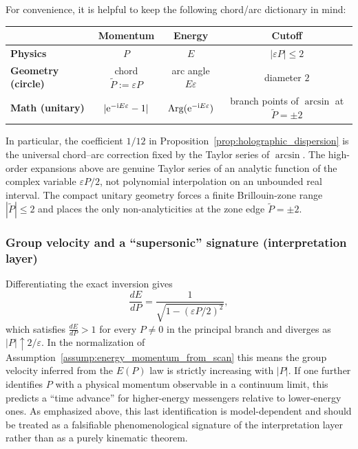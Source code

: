 \begin{remark}
For convenience, it is helpful to keep the following chord/arc dictionary in mind:
{\small
\begin{center}
\renewcommand{\arraystretch}{1.15}
\begin{tabular}{l|c|c|c}
\hline
 & \textbf{Momentum} & \textbf{Energy} & \textbf{Cutoff} \\
\hline
\textbf{Physics} & $P$ & $E$ & $|\varepsilon P|\le 2$ \\
\textbf{Geometry (circle)} & chord $\tilde P:=\varepsilon P$ & arc angle $E\varepsilon$ & diameter $2$ \\
\textbf{Math (unitary)} & $|\mathrm{e}^{-\mathrm{i} E\varepsilon}-1|$ & $\mathrm{Arg}(\mathrm{e}^{-\mathrm{i} E\varepsilon})$ & branch points of $\arcsin$ at $\tilde P=\pm 2$ \\
\hline
\end{tabular}
\end{center}
}
In particular, the coefficient $1/12$ in Proposition~\ref{prop:holographic_dispersion} is the universal chord--arc correction fixed by the Taylor series of $\arcsin$.
The high-order expansions above are genuine Taylor series of an analytic function of the complex variable $\varepsilon P/2$, not polynomial interpolation on an unbounded real interval.
The compact unitary geometry forces a finite Brillouin-zone range $|\tilde P|\le 2$ and places the only non-analyticities at the zone edge $\tilde P=\pm 2$.
\end{remark}

\subsubsection{Group velocity and a ``supersonic'' signature (interpretation layer)}
\label{subsubsec:dispersion_group_velocity}
Differentiating the exact inversion gives
$$
\frac{dE}{dP}=\frac{1}{\sqrt{1-(\varepsilon P/2)^2}},
$$
which satisfies $\frac{dE}{dP}>1$ for every $P\ne 0$ in the principal branch and diverges as $|P|\uparrow 2/\varepsilon$.
In the normalization of Assumption~\ref{assump:energy_momentum_from_scan} this means the group velocity inferred from the $E(P)$ law is strictly increasing with $|P|$.
If one further identifies $P$ with a physical momentum observable in a continuum limit, this predicts a ``time advance'' for higher-energy messengers relative to lower-energy ones.
As emphasized above, this last identification is model-dependent and should be treated as a falsifiable phenomenological signature of the interpretation layer rather than as a purely kinematic theorem.

